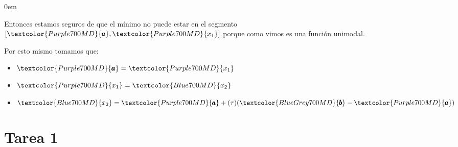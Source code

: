 \documentclass[12pt, fleqn]{article}                            %
\newenvironment{SmallIndentation}[1][0.75em]                    %
        {\begin{adjustwidth}{#1}{}\begin{footnotesize}}             %
        {\end{footnotesize}\end{adjustwidth}}                       %
\theoremstyle{break}                                            %
\newcommand{\Color}[2]{\textcolor{#1}{#2}}                      %
\newcommand \ColorVarA         {Purple700MD}                    %
\newcommand \ColorVarB         {BlueGrey700MD}                  %
\newcommand \ColorVarXOne      {Purple700MD}                    %
\newcommand \ColorVarXTwo      {Blue700MD}                      %
\newcommand \VarA        {\Color{\ColorVarA}{\pmb{a} }}                 %
\newcommand \VarB        {\Color{\ColorVarB}{\pmb{b} }}                 %
\newcommand \VarXOne     {\Color{\ColorVarXOne}{x_{1}  }}               %
\newcommand \VarXTwo     {\Color{\ColorVarXTwo}{x_{2}  }}               %
\begin{document}
\begin{SmallIndentation}[0em]
\begin{multicols*}{2}
\begin{itemize}
                        Entonces estamos seguros de que el mínimo no puede estar en el segmento 
                        $[\VarA, \VarXOne]$ porque como vimos es una función unimodal.

                        Por esto mismo tomamos que:
                            \begin{itemize}
                                \item $\VarA = \VarXOne$
                                \item $\VarXOne = \VarXTwo$
                                \item $\VarXTwo = \VarA + (\tau)(\VarB - \VarA)$
                            \end{itemize}

                    \end{itemize}
                \end{multicols*}

            \end{SmallIndentation}



    \clearpage
    \section{Tarea 1}
\end{document}
